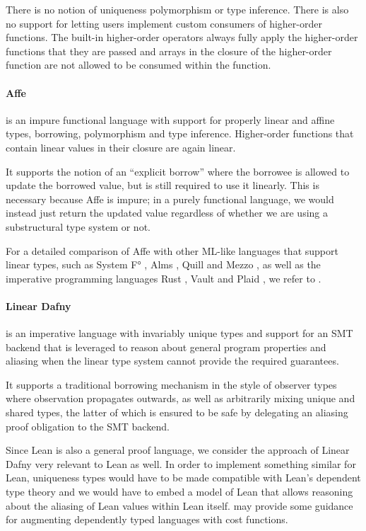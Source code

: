 There is no notion of uniqueness polymorphism or type inference. There is also no support for letting users implement custom consumers of higher-order functions. The built-in higher-order operators always fully apply the higher-order functions that they are passed and arrays in the closure of the higher-order function are not allowed to be consumed within the function.

\paragraph{Affe \citep{radanne_kindly_2020}} is an impure functional language with support for properly linear and affine types, borrowing, polymorphism and type inference. Higher-order functions that contain linear values in their closure are again linear.

It supports the notion of an ``explicit borrow'' where the borrowee is allowed to update the borrowed value, but is still required to use it linearly. This is necessary because Affe is impure; in a purely functional language, we would instead just return the updated value regardless of whether we are using a substructural type system or not.

For a detailed comparison of Affe with other ML-like languages that support linear types, such as System F° \citep{mazurak_lightweight_2010}, Alms \citep{tov_practical_2011}, Quill \citep{morris_best_2016} and Mezzo \citep{balabonski_design_2016}, as well as the imperative programming languages Rust \citep{weiss_oxide_2021}, Vault \citep{deline_enforcing_2001} and Plaid \citep{garcia_foundations_2014}, we refer to \citep{radanne_kindly_2020}.

\paragraph{Linear Dafny \citep{li_linear_2022}} is an imperative language with invariably unique types and support for an SMT backend \citep{barrett_satisfiability_2018} that is leveraged to reason about general program properties and aliasing when the linear type system cannot provide the required guarantees. 

It supports a traditional borrowing mechanism in the style of observer types \citep{odersky_observers_1992} where observation propagates outwards, as well as arbitrarily mixing unique and shared types, the latter of which is ensured to be safe by delegating an aliasing proof obligation to the SMT backend.

Since Lean is also a general proof language, we consider the approach of Linear Dafny very relevant to Lean as well. In order to implement something similar for Lean, uniqueness types would have to be made compatible with Lean's dependent type theory and we would have to embed a model of Lean that allows reasoning about the aliasing of Lean values within Lean itself. \cite{niu_cost-aware_2022} may provide some guidance for augmenting dependently typed languages with cost functions.